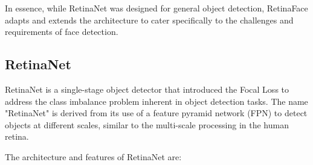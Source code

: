 \documentclass{article}
\begin{document}
In essence, while RetinaNet was designed for general object detection, RetinaFace adapts and extends the architecture to cater specifically to the challenges and requirements of face detection.

\subsection{RetinaNet}

RetinaNet \cite{lin2017focal} is a single-stage object detector that introduced the Focal Loss to address the class imbalance problem inherent in object detection tasks. The name "RetinaNet" is derived from its use of a feature pyramid network (FPN) to detect objects at different scales, similar to the multi-scale processing in the human retina.

The architecture and features of RetinaNet are:
\end{document}
